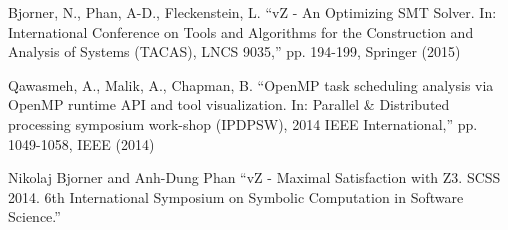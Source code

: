 \begin{thebibliography}{5}
Bjorner, N., Phan, A-D., Fleckenstein, L. ``{vZ - An Optimizing SMT Solver. In: International Conference on Tools and Algorithms for the Construction and Analysis of Systems (TACAS), LNCS 9035},'' pp. 194-199, Springer (2015)

Qawasmeh, A., Malik, A., Chapman, B. ``{OpenMP task scheduling analysis via OpenMP runtime API and tool visualization. In: Parallel \& Distributed processing symposium work-shop (IPDPSW), 2014 IEEE International},'' pp. 1049-1058, IEEE (2014)

Nikolaj Bjorner and Anh-Dung Phan ``{vZ - Maximal Satisfaction with Z3. SCSS 2014. 6th International Symposium on Symbolic Computation in Software Science.}''

\end{thebibliography}




